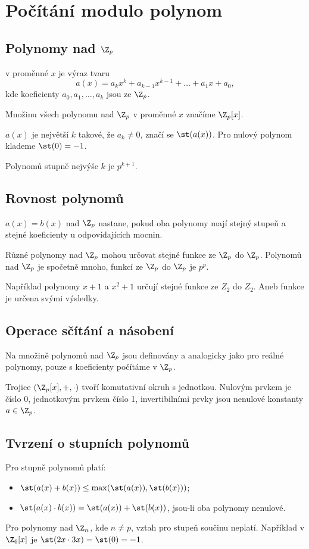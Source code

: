 \section{Počítání modulo polynom}
\subsection{Polynomy nad \texorpdfstring{$\Z_p$}{Zp}}
 v proměnné $x$ je výraz tvaru
\begin{equation}
	a(x) = a_k x^k + a_{k-1}x^{k-1} + \dots + a_1x + a_0,
\end{equation}
kde koeficienty $a_0, a_1, \dots, a_k$ jsou ze $\Z_p$.

Množinu všech polynomu nad $\Z_p$ v proměnné $x$ značíme $\Z_p[x]$.

 $a(x)$ je největší $k$ takové, že $a_k \not = 0$, značí se $\st(a(x))$. Pro nulový polynom klademe $\st(0) = -1$.

Polynomů stupně nejvýše $k$ je $p^{k+1}$.

\subsection{Rovnost polynomů}
 $a(x) = b(x)$ nad $\Z_p$ nastane, pokud oba polynomy mají stejný stupeň a stejné koeficienty u odpovídajících mocnin.

Různé polynomy nad $\Z_p$ mohou určovat stejné funkce ze $\Z_p$ do $\Z_p$. Polynomů nad $\Z_p$ je spočetně mnoho, funkcí ze $\Z_p$ do $\Z_p$ je $p^p$.

Například polynomy $x+1$ a $x^2 + 1$ určují stejné funkce ze $Z_2$ do $Z_2$. Aneb funkce je určena svými výsledky.

\subsection{Operace sčítání a násobení}
Na množině polynomů nad $\Z_p$ jsou definovány  a  analogicky jako pro reálné polynomy, pouze s koeficienty počítáme v $\Z_p$.

Trojice $(\Z_p[x], +, \cdot)$ tvoří komutativní okruh s jednotkou. Nulovým prvkem je číslo 0, jednotkovým prvkem číslo 1, invertibilními prvky jsou nenulové konstanty $a \in \Z_p$.

\subsection{Tvrzení o stupních polynomů}
Pro stupně polynomů platí:
\vspace{-1em}
\begin{itemize}
	\item $\st(a(x) + b(x)) \leq \max(\st(a(x)), \st(b(x)))$;
	\item $\st(a(x) \cdot b(x)) = \st(a(x)) + \st(b(x))$, jsou-li oba polynomy nenulové.
\end{itemize}
Pro polynomy nad $\Z_n$, kde $n \not= p$, vztah pro stupeň součinu neplatí. Například v $\Z_6[x]$ je $\st(2x \cdot 3x) = \st(0) = -1$.

